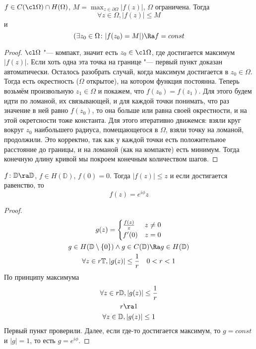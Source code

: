 \begin{conseq}
	$f \in C(\cl \Omega) \cap H(\Omega)$, $M = \max_{z \in \partial \Omega} |f(z)|$, $\Omega$ ограничена.
	Тогда
	\[ \forall z \in \Omega, |f(z)| \le M \]
	и
	\[ (\exists z_0 \in \Omega \colon |f(z_0) = M|) \Ra f = const \]
\end{conseq}
\begin{proof}
	$\cl \Omega$ "--- компакт, значит есть $z_0 \in \cl \Omega$, где достигается максимум $|f(z)|$.
	Если хоть одна эта точка на границе "--- первый пункт доказан автоматически.
	Осталось разобрать случай, когда максимум достигается в $z_0 \in \Omega$.
	Тогда есть окрестность ($\Omega$ открытое), на котором функция постоянна.
	Теперь возьмём произвольную $z_1 \in \Omega$ и покажем, что $f(z_0) = f(z_1)$.
	Для этого будем идти по ломаной, их связывающей, и для каждой точки понимать, что раз значение в ней равно $f(z_0)$,
	то она больше или равна своей окрестности, и на этой окретсности тоже константа.
	Для этого итеративно движемся: взяли круг вокруг $z_0$ наибольшего радиуса, помещающегося в $\Omega$, взяли точку на ломаной, продолжили.
	Это корректно, так как у каждой точки есть положительное расстояние до границы, и на ломаной (как на компакте) есть минимум.
	Тогда конечную длину кривой мы покроем конечным количеством шагов.
\end{proof}

\begin{lemma}[Шварца]
	$f\colon \mathbb D \ra \mathbb D$, $f \in H(\mathbb D)$, $f(0) = 0$.
	Тогда $|f(z)| \le z$ и если достигается равенство, то
	\[ f(z) = e^{i\phi}z \]
\end{lemma}
\begin{proof}
	\begin{gather*}
		g(z) = \begin{cases} \frac{f(z)}z & z \ne 0 \\ f'(0) & z = 0 \end{cases} \\
		g \in H(\mathbb D \setminus \{0\}) \land g \in C(\mathbb D) \Ra g \in H(\mathbb D) \\
		\forall z \in r\mathbb T, |g(z)| \le \frac1r \quad 0 < r < 1
	\end{gather*}
	По принципу максимума
	\begin{gather*}
		\forall z \in r\mathbb D, |g(z)| \le \frac1r \\
		r \ra 1 \\
		\forall z \in \mathbb D, |g(z)| \le 1
	\end{gather*}
	Первый пункт проверили.
	Далее, если где-то достигается максимум, то $g = const$ и $|g| = 1$, то есть $g=e^{i\phi}$.
\end{proof}
